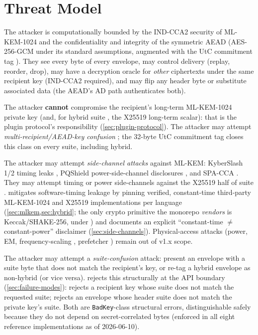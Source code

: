 \section{Threat Model}
\label{sec:threat-model}

The attacker is computationally bounded by the IND-CCA2 security of ML-KEM-1024 \citep{fips203,hofheinz2017fo} and the confidentiality and integrity of the symmetric AEAD (AES-256-GCM under its standard assumptions, augmented with the UtC commitment tag \citep{bellare2022commitment}). They see every byte of every envelope, may control delivery (replay, reorder, drop), may have a decryption oracle for \emph{other} ciphertexts under the same recipient key (IND-CCA2 required), and may flip any header byte or substitute associated data (the AEAD's AD path authenticates both).

The attacker \textbf{cannot} compromise the recipient's long-term ML-KEM-1024 private key (and, for hybrid suite , the X25519 long-term scalar): that is the plugin protocol's responsibility (\cref{sec:plugin-protocol}). The attacker may attempt \emph{multi-recipient/AEAD-key confusion} \citep{grubbs2017aead,albertini2020aead,len2021aead}; the 32-byte UtC commitment tag closes this class on every suite, including hybrid.

The attacker may attempt \emph{side-channel attacks} against ML-KEM: KyberSlash 1/2 timing leaks \citep{kyberslash}, PQShield power-side-channel disclosures \citep{pqshield2024}, and SPA-CCA \citep{guo2024spa}. They may attempt timing or power side-channels against the X25519 half of suite . \pqcrypt{} mitigates software-timing leakage by pinning verified, constant-time third-party ML-KEM-1024 and X25519 implementations per language (\cref{sec:mlkem,sec:hybrid}; the only crypto primitive the monorepo \emph{vendors} is Keccak/SHAKE-256, under ) and documents an explicit ``constant-time $\neq$ constant-power'' disclaimer (\cref{sec:side-channels}). Physical-access attacks (power, EM, frequency-scaling \citep{hertzbleed}, prefetcher \citep{gofetch}) remain out of v1.x scope.

The attacker may attempt a \emph{suite-confusion} attack: present an envelope with a suite byte that does not match the recipient's key, or re-tag a hybrid envelope as non-hybrid (or vice versa). \pqcrypt{} rejects this structurally at the API boundary (\cref{sec:failure-modes}):  rejects a recipient key whose suite does not match the requested suite;  rejects an envelope whose header suite does not match the private key's suite. Both are \texttt{BadKey}-class structural errors, distinguishable safely because they do not depend on secret-correlated bytes (enforced in all eight reference implementations as of 2026-06-10).

